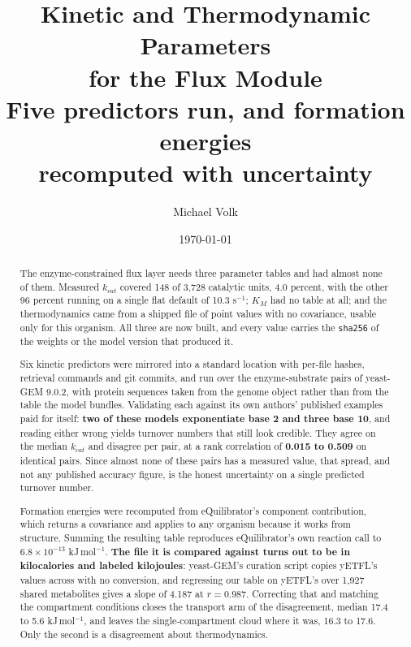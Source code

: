\documentclass[10pt,a4paper]{article}
\title{\vspace{-1.5em}Kinetic and Thermodynamic Parameters\\for the Flux Module\\
  {\large Five predictors run, and formation energies\\
   recomputed with uncertainty}}
\author{Michael Volk}
\date{\today}
\begin{document}
\maketitle
\thispagestyle{empty}

\begin{abstract}
\noindent
The enzyme-constrained flux layer needs three parameter tables and had almost none of
them. Measured $k_{cat}$ covered 148 of 3{,}728 catalytic units, 4.0 percent, with the
other 96 percent running on a single flat default of 10.3 s$^{-1}$; $K_M$ had no table at
all; and the thermodynamics came from a shipped file of point values with no covariance,
usable only for this organism. All three are now built, and every value carries the
\texttt{sha256} of the weights or the model version that produced it.

Six kinetic predictors were mirrored into a standard location with per-file hashes,
retrieval commands and git commits, and run over the enzyme-substrate pairs of yeast-GEM
9.0.2, with protein sequences taken from the genome object rather than from the table the
model bundles. Validating each against its own authors' published examples paid for itself:
\textbf{two of these models exponentiate base 2 and three base 10}, and reading either
wrong yields turnover numbers that still look credible. They agree on the median $k_{cat}$
and disagree per pair, at a rank correlation of \textbf{0.015 to 0.509} on identical pairs.
Since almost none of these pairs has a measured value, that spread, and not any published
accuracy figure, is the honest uncertainty on a single predicted turnover number.

Formation energies were recomputed from eQuilibrator's component contribution, which
returns a covariance and applies to any organism because it works from structure. Summing
the resulting table reproduces eQuilibrator's own reaction call to
$6.8\times10^{-13}$ kJ\,mol$^{-1}$. \textbf{The file it is compared against turns out to be
in kilocalories and labeled kilojoules}: yeast-GEM's curation script copies yETFL's values
across with no conversion, and regressing our table on yETFL's over 1{,}927 shared
metabolites gives a slope of 4.187 at $r = 0.987$. Correcting that and matching the
compartment conditions closes the transport arm of the disagreement, median 17.4 to
5.6 kJ\,mol$^{-1}$, and leaves the single-compartment cloud where it was, 16.3 to 17.6.
Only the second is a disagreement about thermodynamics.


\end{abstract}
\end{document}
